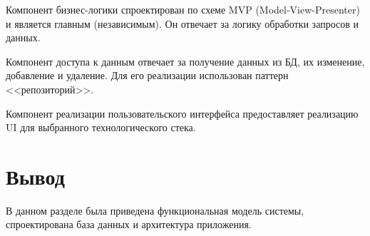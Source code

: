 Компонент бизнес-логики спроектирован по схеме MVP (Model-View-Presenter) и является главным (независимым). Он отвечает за логику обработки запросов и данных.

Компонент доступа к данным отвечает за получение данных из БД, их изменение, добавление и удаление. Для его реализации использован паттерн <<репозиторий>>. 

Компонент реализации пользовательского интерфейса предоставляет реализацию UI для выбранного технологического стека.

\section*{Вывод}

В данном разделе была приведена функциональная модель системы, спроектирована база данных и архитектура приложения.




